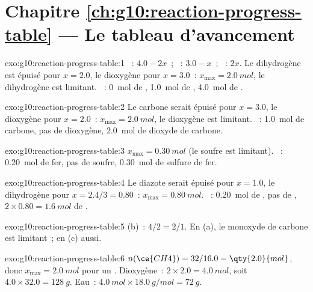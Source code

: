 \section*{Chapitre \ref{ch:g10:reaction-progress-table} --- Le tableau d'avancement}

\begin{solution}{exo:g10:reaction-progress-table:1}
~: $4.0 - 2x$~; ~: $3.0 - x$~; ~: $2x$. Le
dihydrogène est épuisé pour $x = 2.0$, le dioxygène pour $x = 3.0$~:
$x_{\max} = \qty{2.0}{mol}$, le dihydrogène est limitant. ~:
\qty{0}{mol} de , \qty{1.0}{mol} de , \qty{4.0}{mol} de
.
\end{solution}

\begin{solution}{exo:g10:reaction-progress-table:2}
Le carbone serait épuisé pour $x = 3.0$, le dioxygène pour $x = 2.0$~:
$x_{\max} = \qty{2.0}{mol}$, le dioxygène est limitant. ~:
\qty{1.0}{mol} de carbone, pas de dioxygène, \qty{2.0}{mol} de dioxyde
de carbone.
\end{solution}

\begin{solution}{exo:g10:reaction-progress-table:3}
$x_{\max} = \qty{0.30}{mol}$ (le soufre est limitant). ~:
\qty{0.20}{mol} de fer, pas de soufre, \qty{0.30}{mol} de sulfure de
fer.
\end{solution}

\begin{solution}{exo:g10:reaction-progress-table:4}
Le diazote serait épuisé pour $x = 1.0$, le dihydrogène pour
$x = 2.4/3 = 0.80$~: $x_{\max} = \qty{0.80}{mol}$. ~:
\qty{0.20}{mol} de , pas de ,
$2 \times 0.80 = \qty{1.6}{mol}$ de .
\end{solution}

\begin{solution}{exo:g10:reaction-progress-table:5}
(b)~: $4/2 = 2/1$. En (a), le monoxyde de carbone est limitant~; en
(c) aussi.
\end{solution}

\begin{solution}{exo:g10:reaction-progress-table:6}
$n(\ce{CH4}) = 32 / 16.0 = \qty{2.0}{mol}$, donc $x_{\max} = \qty{2.0}{mol}$
pour un . Dioxygène~: $2 \times 2.0 = \qty{4.0}{mol}$,
soit $4.0 \times 32.0 = \qty{128}{g}$. Eau~:
$\qty{4.0}{mol} \times \qty{18.0}{g/mol} = \qty{72}{g}$.
\end{solution}

